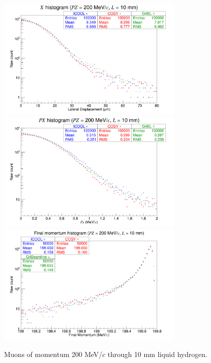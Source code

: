 \begin{figure}[!htb]
  \centering
    \includegraphics[width=0.8\textwidth]{Validation/LH/X.200.10.png} 
    \includegraphics[width=0.8\textwidth]{Validation/LH/PX.200.10.png} 
    \includegraphics[width=0.8\textwidth]{Validation/LH/strag.200.10.png} 
  \caption{Muons of momentum 200 MeV/$c$ through 10 mm liquid hydrogen.}
  \label{fig:200.10}
\end{figure}

